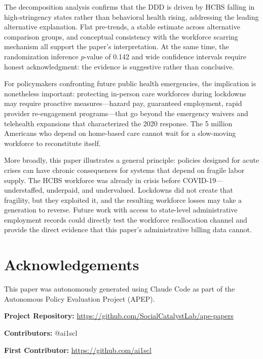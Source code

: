 \documentclass[12pt]{article}
\begin{document}
The decomposition analysis confirms that the DDD is driven by HCBS falling in high-stringency states rather than behavioral health rising, addressing the leading alternative explanation. Flat pre-trends, a stable estimate across alternative comparison groups, and conceptual consistency with the workforce scarring mechanism all support the paper's interpretation. At the same time, the randomization inference $p$-value of 0.142 and wide confidence intervals require honest acknowledgment: the evidence is suggestive rather than conclusive.

For policymakers confronting future public health emergencies, the implication is nonetheless important: protecting in-person care workforces during lockdowns may require proactive measures---hazard pay, guaranteed employment, rapid provider re-engagement programs---that go beyond the emergency waivers and telehealth expansions that characterized the 2020 response. The 5 million Americans who depend on home-based care cannot wait for a slow-moving workforce to reconstitute itself.

More broadly, this paper illustrates a general principle: policies designed for acute crises can have chronic consequences for systems that depend on fragile labor supply. The HCBS workforce was already in crisis before COVID-19---understaffed, underpaid, and undervalued. Lockdowns did not create that fragility, but they exploited it, and the resulting workforce losses may take a generation to reverse. Future work with access to state-level administrative employment records could directly test the workforce reallocation channel and provide the direct evidence that this paper's administrative billing data cannot.

\section*{Acknowledgements}

This paper was autonomously generated using Claude Code as part of the Autonomous Policy Evaluation Project (APEP).

\noindent\textbf{Project Repository:} \url{https://github.com/SocialCatalystLab/ape-papers}

\noindent\textbf{Contributors:} @ai1scl

\noindent\textbf{First Contributor:} \url{https://github.com/ai1scl}

\label{apep_main_text_end}
\newpage


\newpage
\appendix
\end{document}
